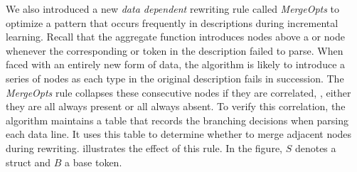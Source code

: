 We also introduced a new {\em data dependent} rewriting rule called {\em MergeOpts}
to optimize a pattern that occurs frequently in descriptions during incremental
learning.  Recall that the aggregate function
introduces  nodes above a  or  node 
whenever the corresponding  or  token in 
the description failed to 
parse. When faced with an entirely new form of data, 
the algorithm is likely to introduce a series of  nodes as
each type in the original description fails in succession. 
The {\em MergeOpts} rule collapses these consecutive  nodes if they
are correlated, \ie{}, either they are all always present or all always
absent.  To verify this correlation, the algorithm maintains a
table that records the branching decisions when parsing each
data line. It uses this table to determine whether to merge
adjacent  nodes during rewriting. 
 illustrates the effect of this rule.  In the figure,
$S$ denotes a struct and $B$ a base token.

\vspace{20pt}
